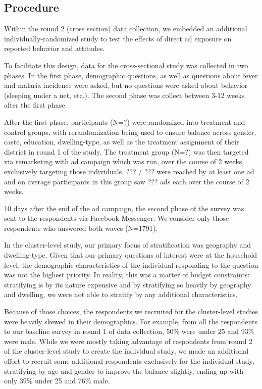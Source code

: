 \documentclass[a4paper,12pt]{article}
\theoremstyle{proposition}
\begin{document}
\subsection{Procedure}

Within the round 2 (cross section) data collection, we embedded an additional individually-randomized study to test the effects of direct ad exposure on reported behavior and attitudes.

To facilitate this design, data for the cross-sectional study was collected in two phases. In the first phase, demographic questions, as well as questions about fever and malaria incidence were asked, but no questions were asked about behavior (sleeping under a net, etc.). The second phase was collect between 3-12 weeks after the first phase.

After the first phase, participants (N=?) were randomized into treatment and control groups, with rerandomization being used to ensure balance across gender, caste, education, dwelling-type, as well as the treatment assignment of their district in round 1 of the study. The treatment group (N=?) was then targeted via remarketing with ad campaign which was run, over the course of 2 weeks, exclusively targeting those individuals. ??? / ??? were reached by at least one ad and on average participants in this group saw ??? ads each over the course of 2 weeks.

10 days after the end of the ad campaign, the second phase of the survey was sent to the respondents via Facebook Messenger. We consider only those respondents who answered both waves (N=1791).

In the cluster-level study, our primary focus of stratification was geography and dwelling-type. Given that our primary questions of interest were at the household level, the demographic characteristics of the individual responding to the question was not the highest priority. In reality, this was a matter of budget constraints: stratifying is by its nature expensive and by stratifying so heavily by geography and dwelling, we were not able to stratify by any additional characteristics.

Because of those choices, the respondents we recruited for the cluster-level studies were heavily skewed in their demographics. For example, from all the respondents to our baseline survey in round 1 of data collection, 50\% were under 25 and 93\% were male. While we were mostly taking advantage of respondents from round 2 of the cluster-level study to create the individual study, we made an additional effort to recruit some additional respondents exclusively for the individual study, stratifying by age and gender to improve the balance slightly, ending up with only 39\% under 25 and 76\% male.
\end{document}
